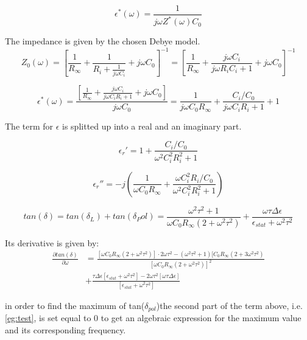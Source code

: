 \begin{equation}
\epsilon^*(\omega) = \frac{1}{j \omega  Z^*(\omega) C_0}
\end{equation}

The impedance is given by the chosen Debye model. 
\begin{equation}
Z_0(\omega)=[\frac{1}{R_\infty}+\frac{1}{R_i+\frac{1}{j \omega C_i}}+j \omega C_0]^{-1} = [\frac{1}{R_\infty}+\frac{j \omega C_i}{j\omega R_i  C_i+1}+j \omega C_0]^{-1}
\end{equation}

\begin{equation}
\epsilon^*(\omega)= \frac{[\frac{1}{R_\infty}+\frac{j \omega C_i}{j\omega C_i R_i  +1}+j \omega C_0]}{j \omega C_0} = \frac{1}{j \omega C_0 R_\infty}+ \frac{C_i/C_0}{j\omega C_i R_i  +1}+1
\end{equation}

The term for $\epsilon$ is splitted up into a real and an imaginary part. 

\begin{equation}
\epsilon_r' = 1+ \frac{C_i/C_0}{\omega^2 C_i^2 R_i^2 +1}
\end{equation}

\begin{equation}
\epsilon_r'' = -j \left(\frac{1}{\omega C_0 R_\infty}+\frac{\omega C_i^2 R_i / C_0}{\omega^2 C_i^2 R_i^2 +1} \right)
\end{equation}

\begin{equation}
tan(\delta) = tan(\delta_L) + tan( \delta_Pol) = \frac{\omega^2 \tau^2+1}{\omega C_0 R_\infty (2+ \omega^2 \tau^2)}+\frac{\omega \tau \Delta \epsilon}{\epsilon_{stat} + \omega^2 \tau^2}
\end{equation}

Its derivative is given by: 
\begin{align}
\frac{\partial tan(\delta)}{ \partial \omega} & = \frac{[\omega C_0 R_\infty (2+\omega^2 \tau^2)]\cdot 2 \omega \tau^2 - (\omega^2 \tau^2 +1) [C_0 R_\infty (2+3 \omega^2 \tau^2)  }{[\omega C_0 R_\infty (2+\omega^2 \tau^2)]^2}\\
					      & + \frac{\tau \Delta \epsilon [\epsilon_{stat} + \omega^2 \tau^2] - 2 \omega \tau^2 [\omega \tau \Delta \epsilon]}{[\epsilon_{stat} +\omega^2 \tau^2]}
\label{eg:test}
					      \end{align}

in order to find the maximum of tan($\delta_{pol}$)the second part of the term above, i.e. \eqref{eg:test}, is set equal to 0 to get an algebraic expression
for the maximum value and its corresponding frequency.

